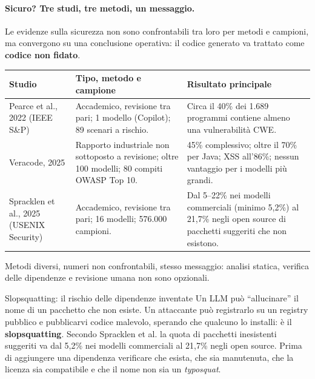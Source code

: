 \documentclass[12pt]{extarticle}
\begin{document}
\paragraph{Sicuro? Tre studi, tre metodi, un messaggio.}
Le evidenze sulla sicurezza non sono confrontabili tra loro per metodi e campioni, ma convergono su una conclusione operativa: il codice generato va trattato come \textbf{codice non fidato}.

\begin{center}
\small
\begin{tabular}{p{3.4cm}p{6.8cm}p{5.8cm}}
    \toprule
    \textbf{Studio} & \textbf{Tipo, metodo e campione} & \textbf{Risultato principale} \\
    \midrule
    Pearce et al., 2022 (IEEE S\&P) & Accademico, revisione tra pari; 1 modello (Copilot); 89 scenari a rischio. & Circa il 40\% dei 1.689 programmi contiene almeno una vulnerabilità CWE. \\
    \addlinespace
    Veracode, 2025 & Rapporto industriale non sottoposto a revisione; oltre 100 modelli; 80 compiti OWASP Top 10. & 45\% complessivo; oltre il 70\% per Java; XSS all'86\%; nessun vantaggio per i modelli più grandi. \\
    \addlinespace
    Spracklen et al., 2025 (USENIX Security) & Accademico, revisione tra pari; 16 modelli; 576.000 campioni. & Dal 5--22\% nei modelli commerciali (minimo 5,2\%) al 21,7\% negli open source di pacchetti suggeriti che non esistono. \\
    \bottomrule
\end{tabular}
\end{center}

\noindent Metodi diversi, numeri non confrontabili, stesso messaggio: analisi statica, verifica delle dipendenze e revisione umana non sono opzionali.

\begin{cbox}{Slopsquatting: il rischio delle dipendenze inventate}
Un LLM può ``allucinare'' il nome di un pacchetto che non esiste. Un attaccante può registrarlo su un registry pubblico e pubblicarvi codice malevolo, sperando che qualcuno lo installi: è il \textbf{slopsquatting}. Secondo Spracklen et al. la quota di pacchetti inesistenti suggeriti va dal 5,2\% nei modelli commerciali al 21,7\% negli open source. Prima di aggiungere una dipendenza verificare che esista, che sia manutenuta, che la licenza sia compatibile e che il nome non sia un \textit{typosquat}.
\end{cbox}
\end{document}
